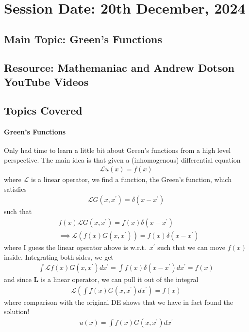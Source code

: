 \section{Session Date: 20th December, 2024}
\subsection*{Main Topic: Green's Functions}
\subsection*{Resource: Mathemaniac and Andrew Dotson YouTube Videos}
\subsection*{Topics Covered}
\paragraph{Green's Functions}
Only had time to learn a little bit about Green's functions from a high level perspective. The main idea is that given a (inhomogenous) differential equation \begin{align*}
    \mathcal{L} u(x) = f(x)
\end{align*}
where \(\mathcal{L} \) is a linear operator, we find a function, the Green's function, which satisfies \begin{align*}
    \mathcal{L} G(x, x^{\prime}) = \delta (x - x^{\prime})
\end{align*} 
such that \begin{align*}
    &f(x) \mathcal{L} G(x, x^{\prime} ) = f(x) \delta (x - x^{\prime} )\\
    &\implies \mathcal{L} \left( f(x) G(x, x^{\prime} )\right) = f(x) \delta (x - x^{\prime} )
\end{align*}
where I guess the linear operator above is w.r.t.\ \(x^{\prime} \) such that we can move \(f(x)\) inside. Integrating both sides, we get \begin{align*}
    \int \mathcal{L}  f(x) G(x, x^{\prime} ) dx^{\prime} = \int f(x) \delta (x - x^{\prime} ) dx^{\prime} = f(x)
\end{align*} 
and since \(\mathbf{L}\) is a linear operator, we can pull it out of the integral \begin{align*}
    \mathcal{L} \left( \int  f(x) G(x, x^{\prime} ) dx^{\prime} \right) = f(x)
\end{align*} 
where comparison with the original DE shows that we have in fact found the solution! \begin{align*}
    u(x) = \int f(x) G(x, x^{\prime} ) dx^{\prime} 
\end{align*}

